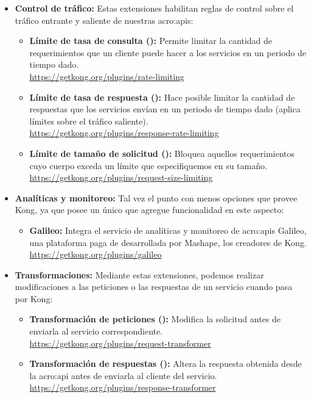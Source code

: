 \begin{itemize}
  \item \textbf{Control de tráfico:} Estas extensiones habilitan reglas de control sobre el tráfico entrante y saliente de nuestras \glspl{acro:api}:
  \begin{itemize}
    \item \textbf{Límite de tasa de consulta ():} Permite limitar la cantidad de requerimientos que un cliente puede hacer a los servicios en un periodo de tiempo dado. \\
    \url{https://getkong.org/plugins/rate-limiting}
    \item \textbf{Límite de tasa de respuesta ():} Hace posible limitar la cantidad de respuestas que los servicios envían en un periodo de tiempo dado (aplica límites sobre el tráfico saliente). \\
    \url{https://getkong.org/plugins/response-rate-limiting}
    \item \textbf{Límite de tamaño de solicitud ():} Bloquea aquellos requerimientos cuyo cuerpo exceda un límite que especifiquemos en su tamaño. \\
    \url{https://getkong.org/plugins/request-size-limiting}
  \end{itemize}

  \item \textbf{Analíticas y monitoreo:} Tal vez el punto con menos opciones que provee Kong, ya que posee un único  que agregue funcionalidad en este aspecto:
  \begin{itemize}
    \item \textbf{Galileo:} Integra el servicio de analíticas y monitoreo de \glspl{acro:api} Galileo, una plataforma paga de  desarrollada por Mashape, los creadores de Kong. \\
    \url{https://getkong.org/plugins/galileo}
  \end{itemize}

  \item \textbf{Transformaciones:} Mediante estas extensiones, podemos realizar modificaciones a las peticiones o las respuestas de un servicio cuando pasa por Kong:
  \begin{itemize}
    \item \textbf{Transformación de peticiones ():} Modifica la solicitud antes de enviarla al servicio correspondiente. \\
    \url{https://getkong.org/plugins/request-transformer}
    \item \textbf{Transformación de respuestas ():} Altera la respuesta obtenida desde la \gls{acro:api} antes de enviarla al cliente del servicio. \\
    \url{https://getkong.org/plugins/response-transformer}
  \end{itemize}


\end{itemize}
